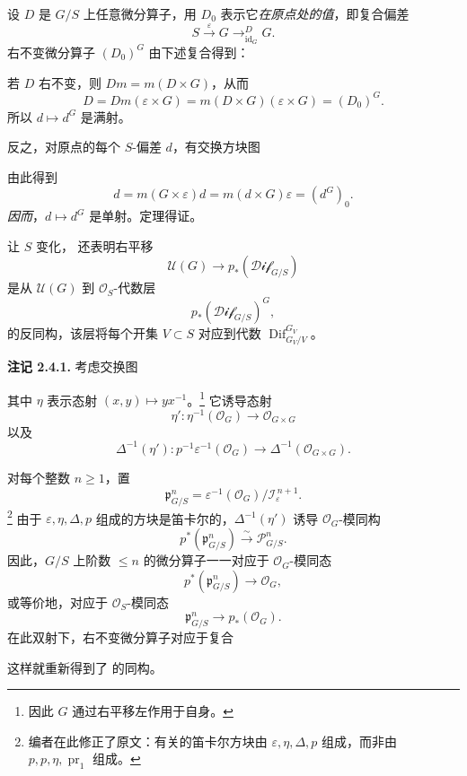 设 \(D\) 是 \(G/S\) 上任意微分算子，用 \(D_0\) 表示它\emph{在原点处的值}，即复合偏差
\[
  S\xrightarrow{\varepsilon}G
   \mathop{\longrightarrow}^{D}_{\operatorname{id}_G}G.
\]
右不变微分算子 \((D_0)^G\) 由下述复合得到：
\begin{center}
  \label{sga3:VIIA:2.4-D0-composite}
  
\end{center}
若 \(D\) 右不变，则 \(Dm=m(D\times G)\)，从而
\[
  D=Dm(\varepsilon\times G)
   =m(D\times G)(\varepsilon\times G)
   =(D_0)^G.
\]
所以 \(d\mapsto d^G\) 是满射。

反之，对原点的每个 \(S\)-偏差 \(d\)，有交换方块图
\begin{center}
  \label{sga3:VIIA:2.4-origin-value-square}
  
\end{center}
由此得到
\[
  d=m(G\times\varepsilon)d
   =m(d\times G)\varepsilon
   =(d^G)_0.
\]
\textit{因而}，\(d\mapsto d^G\) 是单射。定理得证。

让 \(S\) 变化， 还表明右平移
\[
  \mathcal U(G)\longrightarrow p_*(\mathcal{Dif}_{G/S})
\]
是从 \(\mathcal U(G)\) 到 \(\mathcal O_S\)-代数层
\[
  p_*(\mathcal{Dif}_{G/S})^G,
\]
的反同构，该层将每个开集 \(V\subset S\) 对应到代数 \(\operatorname{Dif}^{G_V}_{G_V/V}\)。

\medskip
\noindent\textbf{注记 2.4.1.}
\label{sga3:VIIA:2.4.1}
考虑交换图
\begin{center}
  \label{sga3:VIIA:2.4.1-eta-cartesian-square}
  
\end{center}
其中 \(\eta\) 表示态射 \((x,y)\mapsto yx^{-1}\)。\footnote{因此 \(G\) 通过右平移左作用于自身。}
它诱导态射
\[
  \eta':\eta^{-1}(\mathcal O_G)\longrightarrow\mathcal O_{G\times G}
\]
以及
\[
  \Delta^{-1}(\eta'):
  p^{-1}\varepsilon^{-1}(\mathcal O_G)
  \longrightarrow\Delta^{-1}(\mathcal O_{G\times G}).
\]

对每个整数 \(n\geq1\)，置
\[
  \mathfrak p^n_{G/S}
  =
  \varepsilon^{-1}(\mathcal O_G)/
  \mathcal I_\varepsilon^{\,n+1}.
\]
\footnote{编者在此修正了原文：有关的笛卡尔方块由 \(\varepsilon,\eta,\Delta,p\) 组成，而非由 \(p,p,\eta,\operatorname{pr}_1\) 组成。}
由于 \(\varepsilon,\eta,\Delta,p\) 组成的方块是笛卡尔的，\(\Delta^{-1}(\eta')\) 诱导 \(\mathcal O_G\)-模同构
\[
  p^*(\mathfrak p^n_{G/S})
  \xrightarrow{\sim}
  \mathcal P^n_{G/S}.
\]
因此，\(G/S\) 上阶数 \(\leq n\) 的微分算子一一对应于 \(\mathcal O_G\)-模同态
\[
  p^*(\mathfrak p^n_{G/S})\longrightarrow\mathcal O_G,
\]
或等价地，对应于 \(\mathcal O_S\)-模同态
\[
  \mathfrak p^n_{G/S}\longrightarrow p_*(\mathcal O_G).
\]
在此双射下，右不变微分算子对应于复合
\begin{center}
  \label{sga3:VIIA:2.4.1-invariant-factorization}
  
\end{center}
这样就重新得到了 的同构。

